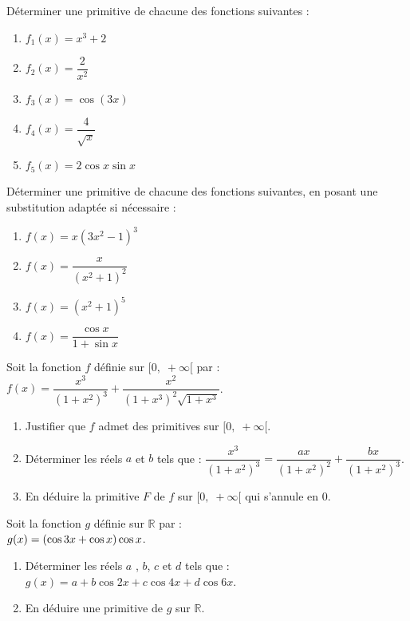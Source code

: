 



 \summary{}
 
\begin{exercice}
Déterminer une primitive de chacune des fonctions suivantes :
\begin{enumerate}
  \item $f_1(x) = x^3+2$
  \item $f_2(x) = \dfrac{2}{x^2}$
  \item $f_3(x) = \cos(3x)$
  \item $f_4(x) = \dfrac{4}{\sqrt{x}}$
  \item $f_5(x) = 2\cos x \sin x$
\end{enumerate}
\end{exercice}

\begin{exercice}
Déterminer une primitive de chacune des fonctions suivantes, en posant une substitution adaptée si nécessaire :
\begin{enumerate}
  \item $f(x) = x(3x^2 - 1)^3$
  \item $f(x) = \dfrac{x}{(x^2 + 1)^2}$
  \item $f(x) = (x^2 + 1)^5$
  \item $f(x) = \dfrac{\cos x}{1 + \sin x}$
\end{enumerate}
\end{exercice}
\begin{exercice}
 Soit la fonction $ f $  définie sur $  [0,\; +\infty[ $  par : \; $ f(x)=\dfrac{x^3}{(1+x^2)^3}+ \dfrac{x^2}{(1+x^3)^2\sqrt{1+x^3}} $.
\begin{enumerate}
\item Justifier que $ f $ admet des primitives sur $  [0,\; +\infty[ $.
\item Déterminer les réels $a $ et $ b$ tels que :\; $ \dfrac{x^3}{(1+x^2)^3}=\dfrac{ax}{(1+x^2)^2}+\dfrac{bx}{(1+x^2)^3} $.
\item En déduire la primitive $ F $ de $ f $  sur $  [0,\; +\infty[ $ qui s'annule en 0.
\end{enumerate}
\end{exercice}
\begin{exercice}
Soit la fonction $ g $  définie sur $ \mathbb{R} $  par : \\ $ g(x)=\left(\cos 3x  +\cos x\right)\cos x $.
\begin{enumerate}
\item Déterminer les réels $a $ , $ b $, $ c $ et $ d$ tels que :\; $ g(x)=a+b\cos 2x +c\cos 4x +d\cos 6x$.
\item En déduire une primitive de $ g $  sur $\mathbb{R} $.  
\end{enumerate}
\end{exercice}

